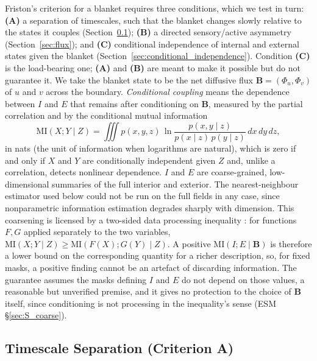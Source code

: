 \documentclass[11pt]{article}
\newcommand{\bB}{\boldsymbol{B}}
\begin{document}
Friston's criterion for a blanket requires three conditions, which we test in turn: \textbf{(A)} a separation of timescales, such that the blanket changes slowly relative to the states it couples \citep{Friston2013} (Section~\ref{sec:timescale}); \textbf{(B)} a directed sensory/active asymmetry (Section~\ref{sec:flux}); and \textbf{(C)} conditional independence of internal and external states given the blanket (Section~\ref{sec:conditional_independence}). Condition \textbf{(C)} is the load-bearing one; \textbf{(A)} and \textbf{(B)} are meant to make it possible but do not guarantee it. We take the blanket state to be the net diffusive flux $\bB{}=(\Phi_u,\Phi_v)$ of $u$ and $v$ across the boundary. \emph{Conditional coupling} means the dependence between $I$ and $E$ that remains after conditioning on $\bB{}$, measured by the partial correlation and by the conditional mutual information
\begin{equation}
\mathrm{MI}(X;Y\mid Z)=\iiint p(x,y,z)\,\ln\frac{p(x,y\mid z)}{p(x\mid z)\,p(y\mid z)}\,dx\,dy\,dz ,
\label{eq:cmi}
\end{equation}
in nats (the unit of information when logarithms are natural), which is zero if and only if $X$ and $Y$ are conditionally independent given $Z$ and, unlike a correlation, detects nonlinear dependence. $I$ and $E$ are coarse-grained, low-dimensional summaries of the full interior and exterior. The nearest-neighbour estimator used below could not be run on the full fields in any case, since nonparametric information estimation degrades sharply with dimension. This coarsening is licensed by a two-sided data processing inequality \citep{CoverThomas2006}: for functions $F,G$ applied separately to the two variables, $\mathrm{MI}(X;Y\mid Z)\ge \mathrm{MI}(F(X);G(Y)\mid Z)$. A positive $\mathrm{MI}(I;E\mid\bB{})$ is therefore a lower bound on the corresponding quantity for a richer description, so, for fixed masks, a positive finding cannot be an artefact of discarding information. The guarantee assumes the masks defining $I$ and $E$ do not depend on those values, a reasonable but unverified premise, and it gives no protection to the choice of $\bB{}$ itself, since conditioning is not processing in the inequality's sense (ESM \S\ref{sec:S_coarse}).

\subsection{Timescale Separation (Criterion A)}
\label{sec:timescale}
\end{document}
